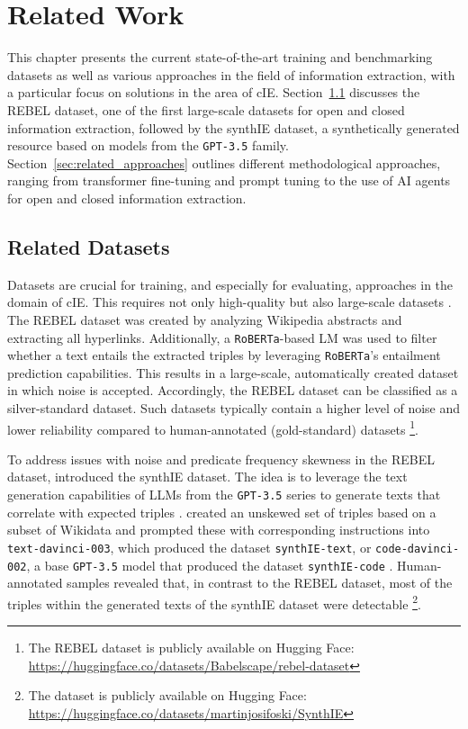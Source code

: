 \documentclass[a4paper,oneside,bibliography=totoc]{scrbook}
\begin{document}
\chapter{Related Work}
\label{ch:related_work_chapter}

This chapter presents the current state-of-the-art training and benchmarking datasets as well as various approaches in the field of information extraction, with a particular focus on solutions in the area of \ac{cIE}. Section~\ref{sec:related_datasets} discusses the REBEL dataset, one of the first large-scale datasets for open and closed information extraction, followed by the synthIE dataset, a synthetically generated resource based on models from the \texttt{GPT-3.5} family. Section~\ref{sec:related_approaches} outlines different methodological approaches, ranging from transformer fine-tuning and prompt tuning to the use of \ac{AI} agents for open and closed information extraction.

\section{Related Datasets}
\label{sec:related_datasets}

Datasets are crucial for training, and especially for evaluating, approaches in the domain of \ac{cIE}. This requires not only high-quality but also large-scale datasets \cite{Josifoski2023}. The REBEL dataset was created by analyzing Wikipedia abstracts and extracting all hyperlinks. Additionally, a \texttt{RoBERTa}-based \ac{LM} was used to filter whether a text entails the extracted triples by leveraging \texttt{RoBERTa}’s entailment prediction capabilities. This results in a large-scale, automatically created dataset in which noise is accepted. Accordingly, the REBEL dataset can be classified as a silver-standard dataset. Such datasets typically contain a higher level of noise and lower reliability compared to human-annotated (gold-standard) datasets \cite{HuguetCabot2021}\footnote{The REBEL dataset is publicly available on Hugging Face: \url{https://huggingface.co/datasets/Babelscape/rebel-dataset}}.

To address issues with noise and predicate frequency skewness in the REBEL dataset, \citet{Josifoski2023} introduced the synthIE dataset. The idea is to leverage the text generation capabilities of \acp{LLM} from the \texttt{GPT-3.5} series to generate texts that correlate with expected triples \cite{Josifoski2023}. \citet{Josifoski2023} created an unskewed set of triples based on a subset of Wikidata and prompted these with corresponding instructions into \texttt{text-davinci-003}, which produced the dataset \texttt{synthIE-text}, or \texttt{code-davinci-002}, a base \texttt{GPT-3.5} model that produced the dataset \texttt{synthIE-code} \cite{Josifoski2023,OpenAI2025a}. Human-annotated samples revealed that, in contrast to the REBEL dataset, most of the triples within the generated texts of the synthIE dataset were detectable \cite{Josifoski2023}\footnote{The dataset is publicly available on Hugging Face: \url{https://huggingface.co/datasets/martinjosifoski/SynthIE}}.
\end{document}
